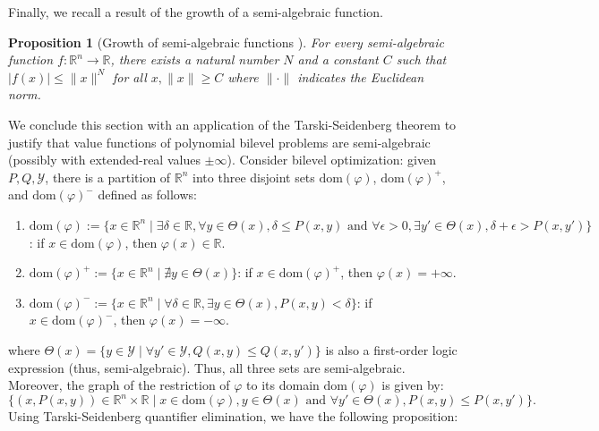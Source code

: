 \documentclass{article}
\newcommand*{\cY}{\mathcal{Y}}
\newcommand*{\RR}{\mathbb{R}}
\newcommand{\firstvar}{x}
\newcommand{\secondvar}{y}
\newcommand{\dom}{\mathrm{dom}}
\newcommand{\valbilevel}{\varphi}
\theoremstyle{plain}
\newtheorem{proposition}[theorem]{Proposition}
\theoremstyle{definition}
\begin{document}
Finally, we recall a result of the growth of a semi-algebraic function.
\begin{proposition}[Growth of semi-algebraic functions {\cite[Section $4.12$]{o-minimal-structures}}]
    \label{lemma:growth-semi-algebraic-functions}
    For every semi-algebraic function $f:\RR^n \to \RR$, there exists a natural number $N$ and a constant $C$ such that $|f(x)| \leq \|x\|^N$ for all $x, \|x\| \geq C$ where $\|\cdot\|$ indicates the Euclidean norm.  
\end{proposition}

We conclude this section with an application of the Tarski-Seidenberg theorem to justify that value functions of polynomial bilevel problems are semi-algebraic (possibly with extended-real values $\pm \infty$). Consider bilevel optimization: given $P, Q, \cY$, there is a partition of $\RR^n$ into three disjoint sets $\dom(\valbilevel)$, $\dom(\valbilevel)^+$, and $\dom(\valbilevel)^-$ defined as follows:
\begin{enumerate}
    \item $\dom(\valbilevel):= \{\firstvar \in \RR^n \mid \exists \delta \in \RR, \forall \secondvar \in \Theta(\firstvar), \delta \leq P(\firstvar, \secondvar) \text{ and } \forall \epsilon > 0, \exists \secondvar' \in \Theta(\firstvar), \delta + \epsilon > P(\firstvar, \secondvar')\}$: if $\firstvar \in \dom(\valbilevel)$, then $\valbilevel(\firstvar) \in \RR$. 
    \item $\dom(\valbilevel)^+ := \{\firstvar \in \RR^n \mid \nexists \secondvar \in \Theta(\firstvar)\}$: if $\firstvar \in \dom(\valbilevel)^+$, then $\valbilevel(\firstvar) = +\infty$. 
    \item $\dom(\valbilevel)^- := \{\firstvar \in \RR^n \mid \forall \delta \in \RR, \exists \secondvar \in \Theta(\firstvar), P(\firstvar, \secondvar) < \delta\}$: if $\firstvar \in \dom(\valbilevel)^-$, then $\valbilevel(\firstvar) = -\infty$.
\end{enumerate}
where $\Theta(\firstvar) = \{y \in \cY \mid \forall \secondvar' \in \cY, Q(\firstvar,\secondvar) \leq Q(\firstvar,\secondvar')\}$ is also a first-order logic expression (thus, semi-algebraic). Thus, all three sets are semi-algebraic. Moreover, the graph of the restriction of $\valbilevel$ to its domain $\dom(\valbilevel)$ is given by:
\begin{equation*}
    \{(\firstvar,P(\firstvar,\secondvar)) \in \RR^n \times \RR \mid \firstvar \in \dom(\valbilevel), \secondvar \in \Theta(\firstvar) \text{ and }  \forall \secondvar' \in \Theta(\firstvar), P(\firstvar,\secondvar) \leq P(\firstvar,\secondvar')\}. 
\end{equation*}
Using Tarski-Seidenberg quantifier elimination, we have the following proposition:
\end{document}
